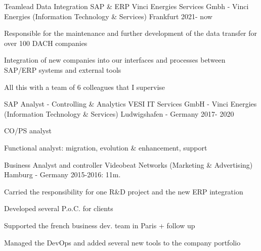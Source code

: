 

\begin{cventries}
  \cventry
    {Teamlead Data Integration SAP \& ERP} %
    {Vinci Energies Services Gmbh - Vinci Energies (Information Technology \& Services)} %
    {Frankfurt} %
    {2021- now} %
    {
    \begin{cvitems} %
      \item {Responsible for the maintenance and further development of the data transfer for over 100 DACH companies}
      \item {Integration of new companies into our interfaces and processes between SAP/ERP systems and external tools}
      \item {All this with a team of 6 colleagues that I supervise}
    \end{cvitems}
  }
\cventry
	{SAP Analyst - Controlling \& Analytics} %
	{VESI IT Services GmbH - Vinci Energies (Information Technology \& Services)} %
	{Ludwigshafen - Germany} %
	{2017- 2020} %
	{
		\begin{cvitems} %
			\item {CO/PS analyst}
			\item {Functional analyst: migration, evolution \& enhancement, support}
		\end{cvitems}
	}

  \cventry
    {Business Analyst and controller} %
    {Videobeat Networks (Marketing \& Advertising)} %
    {Hamburg - Germany} %
    {2015-2016: 11m.} %
    {
      \begin{cvitems} %
        \item {Carried the responsibility for one R\&D project and the new ERP integration}
        \item {Developed several P.o.C. for clients}
        \item {Supported the french business dev. team in Paris + follow up}
        \item {Managed the DevOps and added several new tools to the company portfolio}
      \end{cvitems}
    }


\end{cventries}
